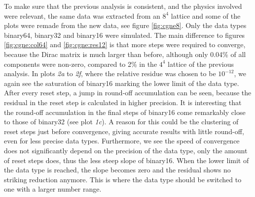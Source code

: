 \documentclass{article}
\theoremstyle{plain} %
\theoremstyle{convention} %
\theoremstyle{remark} %
\numberwithin{equation}{section}
\begin{document}
To make sure that the previous analysis is consistent, and the physics involved were relevant, the same data was extracted from an $8^4$ lattice and some of the plots were remade from the new data, see figure \ref{fig:cgne8}. Only the data types \gls{binary64}, \gls{binary32} and \gls{binary16} were simulated. The main difference to figures \ref{fig:cgne:col64} and \ref{fig:cgne:res12} is that more steps were required to converge, because the Dirac matrix is much larger than before, although only \num{0.04}\% of all components were non-zero, compared to \num{2}\% in the $4^4$ lattice of the previous analysis. In plots \textit{2a} to \textit{2f}, where the relative residue was chosen to be $10^{-12}$, we again see the saturation of \gls{binary16} marking the lower limit of the data type. After every reset step, a jump in round-off accumulation can be seen, because the residual in the reset step is calculated in higher precision. It is interesting that the round-off accumulation in the final steps of \gls{binary16} come remarkably close to those of \gls{binary32} (see plot \textit{1c}). A reason for this could be the clustering of reset steps just before convergence, giving accurate results with little round-off, even for less precise data types. Furthermore, we see the speed of convergence does not significantly depend on the precision of the data type, only the amount of reset steps does, thus the less steep slope of \gls{binary16}. When the lower limit of the data type is reached, the slope becomes zero and the residual shows no striking reduction anymore. This is where the data type should be switched to one with a larger number range.
\end{document}
